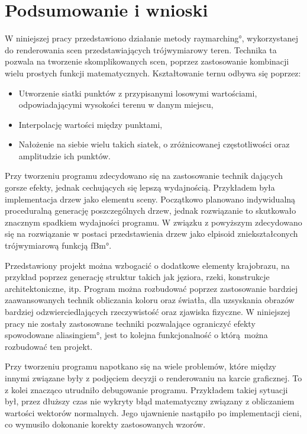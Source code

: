 \chapter{Podsumowanie i wnioski}
W niniejszej pracy przedstawiono działanie metody \ang{raymarching}, wykorzystanej do renderowania scen przedstawiających trójwymiarowy teren.
Technika ta pozwala na tworzenie skomplikowanych scen, poprzez zastosowanie kombinacji wielu prostych funkcji matematycznych. Kształtowanie ternu odbywa się poprzez:
\begin{itemize}
\item Utworzenie siatki punktów z przypisanymi losowymi wartościami, odpowiadającymi wysokości terenu w danym miejscu,
\item Interpolację wartości między punktami,
\item Nałożenie na siebie wielu takich siatek, o zróżnicowanej częstotliwości oraz amplitudzie ich punktów.
\end{itemize}

Przy tworzeniu programu zdecydowano się na zastosowanie technik dających gorsze efekty, jednak cechujących się lepszą wydajnością. Przykładem była implementacja drzew jako elementu sceny. Początkowo planowano indywidualną proceduralną generację poszczególnych drzew, jednak rozwiązanie to skutkowało znacznym spadkiem wydajności programu. W związku z powyższym zdecydowano się na rozwiązanie w postaci przedstawienia drzew jako elpisoid zniekształconych trójwymiarową funkcją \ang{fBm}.

Przedstawiony projekt można wzbogacić o dodatkowe elementy krajobrazu, na przykład
poprzez generację struktur takich jak jęziora, rzeki, konstrukcje architektoniczne, itp. Program można rozbudować poprzez zastosowanie bardziej zaawansowanych technik obliczania koloru oraz światła, dla uzsyskania obrazów bardziej odzwierciedlających rzeczywistość oraz zjawiska fizyczne. W niniejszej pracy nie zostały zastosowane techniki pozwalające ograniczyć efekty spowodowane \ang{aliasingiem}, jest to kolejna funkcjonalność o którą można rozbudować ten projekt.

Przy tworzeniu programu napotkano się na wiele problemów, które między innymi związane były z podjęciem decyzji o renderowaniu na karcie graficznej. To z kolei znacząco utrudniło debugowanie programu. Przykładem takiej sytuacji był, przez dłuższy czas nie wykryty błąd matematyczny związany z obliczaniem wartości wektorów normalnych. Jego ujawnienie nastąpiło po implementacji cieni, co wymusiło dokonanie korekty zastosowanych wzorów.

